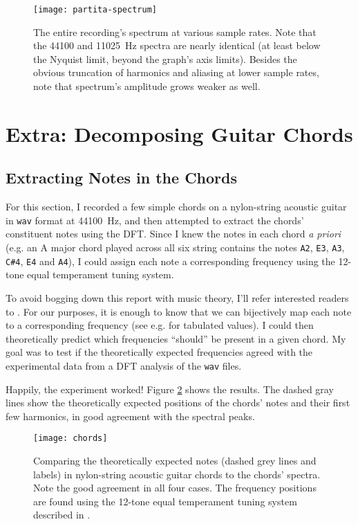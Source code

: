 \documentclass[11pt, a4paper]{article}
\begin{document}
\begin{figure}[htb!]
\centering
\texttt{[image: partita-spectrum]}
\vspace{-8mm}
\caption{The entire recording's spectrum at various sample rates. Note that the 44100 and \SI{11025}{\hertz} spectra are nearly identical (at least below the Nyquist limit, beyond the graph's axis limits). Besides the obvious truncation of harmonics and aliasing at lower sample rates, note that spectrum's amplitude grows weaker as well.}
\label{dft:fig:partita-spectrum}
\end{figure}


\section{Extra: Decomposing Guitar Chords}

\subsection{Extracting Notes in the Chords}
For this section, I recorded a few simple chords on a nylon-string acoustic guitar in \texttt{wav} format at \SI{44100}{\hertz}, and then attempted to extract the chords' constituent notes using the DFT. Since I knew the notes in each chord \textit{a priori} (e.g. an A major chord played across all six string contains the notes \texttt{A2}, \texttt{E3}, \texttt{A3}, \texttt{C\#4}, \texttt{E4} and \texttt{A4}), I could assign each note a corresponding frequency using the 12-tone equal temperament tuning system. 

To avoid bogging down this report with music theory, I'll refer interested readers to \cite{twelve-tet}. For our purposes, it is enough to know that we can bijectively map each note to a corresponding frequency (see e.g. \cite{note-freqs} for tabulated values). I could then theoretically predict which frequencies ``should'' be present in a given chord. My goal was to test if the theoretically expected frequencies agreed with the experimental data from a DFT analysis of the \texttt{wav} files. 

Happily, the experiment worked! Figure \ref{dft:fig:chords} shows the results. The dashed gray lines show the theoretically expected positions of the chords' notes and their first few harmonics, in good agreement with the spectral peaks.


\begin{figure}[htb!]
\centering
\texttt{[image: chords]}
\vspace{-8mm}
\caption{Comparing the theoretically expected notes (dashed grey lines and labels) in nylon-string acoustic guitar chords to the chords' spectra. Note the good agreement in all four cases. The frequency positions are found using the 12-tone equal temperament tuning system described in \cite{twelve-tet}.}
\label{dft:fig:chords}
\end{figure}
\end{document}
